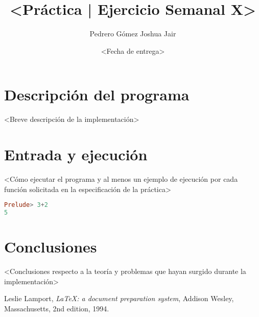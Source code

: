 \documentclass{article}
\title{\textless Práctica | Ejercicio Semanal X\textgreater}
\author{Pedrero Gómez Joshua Jair}
\date{\textless Fecha de entrega\textgreater}
\begin{document}
\maketitle

\section{Descripción del programa}

\textless Breve descripción de la implementación\textgreater

\section{Entrada y ejecución}

\textless Cómo ejecutar el programa y al menos un ejemplo de ejecución por cada función solicitada en la especificación de la práctica\textgreater

\begin{lstlisting}[language=Haskell]
Prelude> 3+2
5
\end{lstlisting}

\section{Conclusiones}

\textless Conclusiones respecto a la teoría y problemas que hayan surgido durante la implementación\textgreater


\begin{thebibliography}{9}

  Leslie Lamport,
  \emph{\LaTeX: a document preparation system},
  Addison Wesley, Massachusetts,
  2nd edition,
  1994.

\end{thebibliography}
\end{document}
